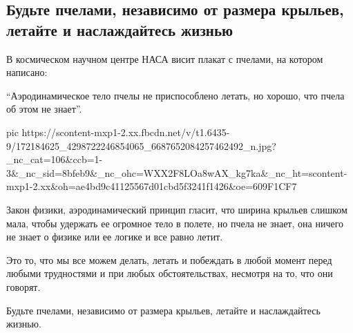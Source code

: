  
 
 
 
 
\subsection{Будьте пчелами, независимо от размера крыльев, летайте и наслаждайтесь жизнью}
\label{sec:11_04_2021.fb.kotova_ksenia.1.pchela_polet_nasa}

В космическом научном центре НАСА висит плакат с пчелами, на котором написано:

\enquote{Аэродинамическое тело пчелы не приспособлено летать, но хорошо, что пчела об этом не знает}.

\ifcmt
  pic https://scontent-mxp1-2.xx.fbcdn.net/v/t1.6435-9/172184625_4298722246854065_6687652084257462492_n.jpg?_nc_cat=106&ccb=1-3&_nc_sid=8bfeb9&_nc_ohc=WXX2F8LOa8wAX_kg7ka&_nc_ht=scontent-mxp1-2.xx&oh=ae4bd9c41125567d01cbd5f3241f1426&oe=609F1CF7
\fi

Закон физики, аэродинамический принцип гласит, что ширина крыльев слишком
мала, чтобы удержать ее огромное тело в полете, но пчела не знает, она ничего
не знает о физике или ее логике и все равно летит.

Это то, что мы все можем делать, летать и побеждать в любой момент перед
любыми трудностями и при любых обстоятельствах, несмотря на то, что они
говорят.

Будьте пчелами, независимо от размера крыльев, летайте и наслаждайтесь жизнью.
